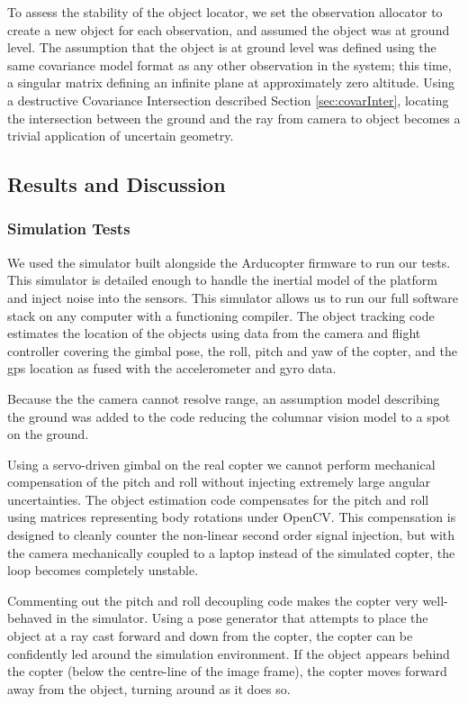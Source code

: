 \documentclass[a4paper, 11pt, titlepage]{article}
\begin{document}
      To assess the stability of the object locator, we set the observation allocator to create a new object for each observation, and assumed the object was at ground level.
      The assumption that the object is at ground level was defined using the same covariance model format as any other observation in the system; this time, a singular matrix defining an infinite plane at approximately zero altitude.
      Using a destructive Covariance Intersection described Section \ref{sec:covarInter}, locating the intersection between the ground and the ray from camera to object becomes a trivial application of uncertain geometry.

  \subsection{Results and Discussion}

    \subsubsection{Simulation Tests}
      We used the simulator built alongside the Arducopter firmware to run our tests.  This simulator is detailed enough to handle the inertial model of the platform and inject noise into the sensors.
      This simulator allows us to run our full software stack on any computer with a functioning compiler.
      The object tracking code estimates the location of the objects using data from the camera and flight controller covering the gimbal pose, the roll, pitch and yaw of the copter, and the \gls{gps} location as fused with the accelerometer and gyro data.

      Because the the camera cannot resolve range, an assumption model describing the ground was added to the code reducing the columnar vision model to a spot on the ground.

      Using a servo-driven gimbal on the real copter we cannot perform mechanical compensation of the pitch and roll without injecting extremely large angular uncertainties.
      The object estimation code compensates for the pitch and roll using matrices representing body rotations under OpenCV.
      This compensation is designed to cleanly counter the non-linear second order signal injection, but with the camera mechanically coupled to a laptop instead of the simulated copter, the loop becomes completely unstable.

      Commenting out the pitch and roll decoupling code makes the copter very well-behaved in the simulator.  Using a pose generator that attempts to place the object at a ray cast forward and down from the copter, the copter can be confidently led around the simulation environment.  If the object appears behind the copter (below the centre-line of the image frame), the copter moves forward away from the object, turning around as it does so.
\end{document}
